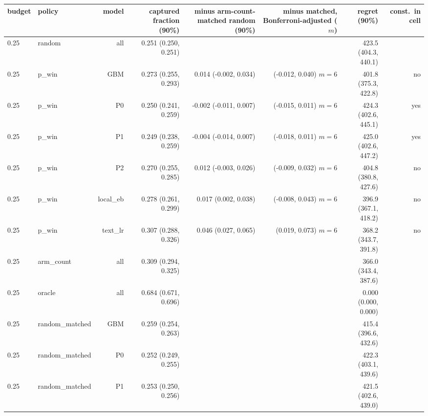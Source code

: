 \begin{tabular}{llrrrrrr}
\toprule
budget & policy & model & captured fraction (90\%) & minus arm-count-matched random (90\%) & minus matched, Bonferroni-adjusted ($m$) & regret (90\%) & const.\ in cell \\
\midrule
0.25 & random & all & 0.251 (0.250, 0.251) &  &  & 423.5 (404.3, 440.1) &  \\
0.25 & p\_win & GBM & 0.273 (0.255, 0.293) & 0.014 (-0.002, 0.034) & (-0.012, 0.040) $m=6$ & 401.8 (375.3, 422.8) & no \\
0.25 & p\_win & P0 & 0.250 (0.241, 0.259) & -0.002 (-0.011, 0.007) & (-0.015, 0.011) $m=6$ & 424.3 (402.6, 445.1) & yes \\
0.25 & p\_win & P1 & 0.249 (0.238, 0.259) & -0.004 (-0.014, 0.007) & (-0.018, 0.011) $m=6$ & 425.0 (402.6, 447.2) & yes \\
0.25 & p\_win & P2 & 0.270 (0.255, 0.285) & 0.012 (-0.003, 0.026) & (-0.009, 0.032) $m=6$ & 404.8 (380.8, 427.6) & no \\
0.25 & p\_win & local\_eb & 0.278 (0.261, 0.299) & 0.017 (0.002, 0.038) & (-0.008, 0.043) $m=6$ & 396.9 (367.1, 418.2) & no \\
0.25 & p\_win & text\_lr & 0.307 (0.288, 0.326) & 0.046 (0.027, 0.065) & (0.019, 0.073) $m=6$ & 368.2 (343.7, 391.8) & no \\
0.25 & arm\_count & all & 0.309 (0.294, 0.325) &  &  & 366.0 (343.4, 387.6) &  \\
0.25 & oracle & all & 0.684 (0.671, 0.696) &  &  & 0.000 (0.000, 0.000) &  \\
0.25 & random\_matched & GBM & 0.259 (0.254, 0.263) &  &  & 415.4 (396.6, 432.6) &  \\
0.25 & random\_matched & P0 & 0.252 (0.249, 0.255) &  &  & 422.3 (403.1, 439.6) &  \\
0.25 & random\_matched & P1 & 0.253 (0.250, 0.256) &  &  & 421.5 (402.6, 439.0) &  \\

\end{tabular}
